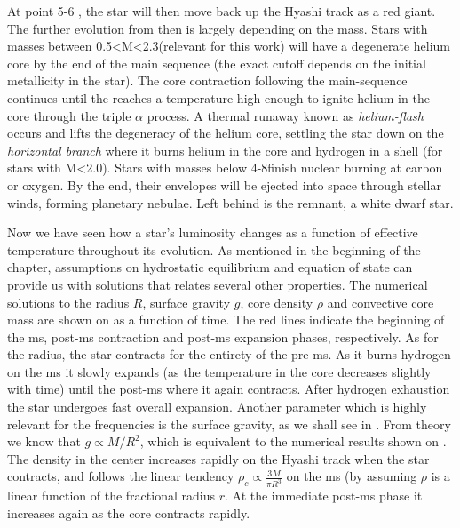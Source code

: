 At point 5-6 , the star will then move back up the Hyashi track as a red giant. The further evolution from then is largely depending on the mass. Stars with masses between 0.5<M<2.3\msun (relevant for this work) will have a degenerate helium core by the end of the main sequence (the exact cutoff depends on the initial metallicity in the star). The core contraction following the main-sequence continues until the reaches a temperature high enough to ignite helium in the core through the triple $\alpha$ process.   A thermal runaway known as \textit{helium-flash} occurs and lifts the degeneracy of the helium core, settling the star down on the \textit{horizontal branch} where it burns helium in the core and hydrogen in a shell (for stars with M<2.0\msun). 
 Stars with masses below 4-8\msun finish nuclear burning  at carbon or oxygen. By the end, their envelopes will be ejected into space through stellar winds, forming planetary nebulae. Left behind is the remnant, a white dwarf star.

Now we have seen how a star's luminosity changes as a function of effective temperature throughout its evolution. As mentioned in the beginning of the chapter, assumptions on hydrostatic equilibrium and equation of state can provide us with solutions that relates several other properties. The numerical solutions to the radius $R$,  surface gravity  $g$, core density $\rho$ and convective core mass are shown on  as a function of time. The red lines indicate the beginning of the ms, post-ms contraction and post-ms expansion phases, respectively. As for the radius, the star contracts for the entirety of the pre-ms. As it burns hydrogen on the ms it slowly expands (as the temperature in the core decreases slightly with time) until the post-ms where it again contracts. After hydrogen exhaustion the star undergoes fast overall expansion. Another parameter which is highly relevant for the frequencies is the surface gravity, as we shall see in . From theory we know that $g \propto M/R^2$, which is equivalent to the numerical results shown on . The density in the center increases rapidly on the Hyashi track when the star contracts, and follows the linear tendency $\rho_c \propto \frac{3M}{\pi R^3}$ on the ms (by assuming $\rho$ is a linear function of the fractional radius $r$. At the immediate post-ms phase it increases again as the core contracts rapidly. 

